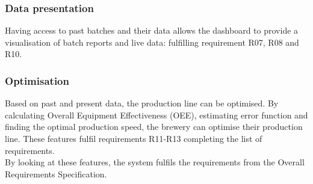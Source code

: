 \subsubsection{Data presentation}
Having access to past batches and their data allows the dashboard to provide a
visualisation of batch reports and live data: fulfilling requirement R07, R08
and R10.

\subsubsection{Optimisation}
Based on past and present data, the production line can be optimised. By
calculating Overall Equipment Effectiveness (OEE), estimating error function and
finding the optimal production speed, the brewery can optimise their production
line. These features fulfil requirements R11-R13 completing the list of
requirements. \\

By looking at these features, the system fulfils the requirements from the
Overall Requirements Specification.